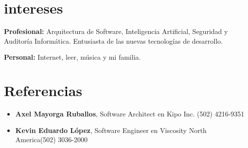 \documentclass[]{friggeri-cv} %
\begin{document}

\section{intereses}

\textbf{Profesional:} Arquitectura de Software, Inteligencia Artificial, Seguridad y Auditoría Informática. Entusiasta de las nuevas tecnologías de desarrollo. 

\textbf{Personal:} Internet, leer, música y mi familia.

\section{Referencias}

\begin{itemize}
	\item \noindent \textbf{Axel Mayorga Ruballos},  Software Architect en Kipo Inc. \hfill \hfill (502) 4216-9351
	\item \noindent \textbf{Kevin Eduardo López}, Software Engineer en Viscosity North America\hfill \hfill (502) 3036-2000
\end{itemize}

\end{document}
